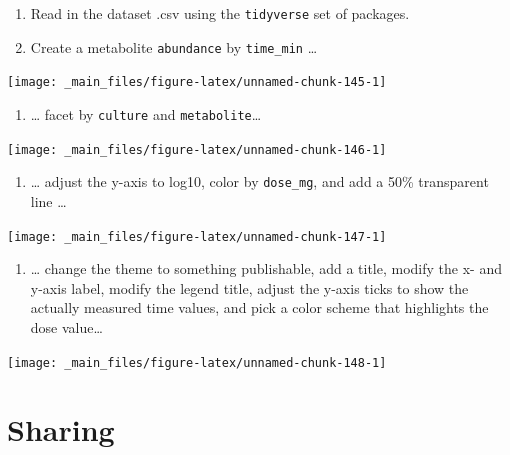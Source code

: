 \documentclass[
]{book}
\providecommand{\tightlist}{%
  \setlength{\itemsep}{0pt}\setlength{\parskip}{0pt}}
\begin{document}
\begin{enumerate}
\def\labelenumi{\arabic{enumi}.}
\setcounter{enumi}{1}
\item
  Read in the dataset .csv using the \texttt{tidyverse} set of packages.
\item
  Create a metabolite \texttt{abundance} by \texttt{time\_min} \ldots{}
\end{enumerate}

\begin{center}\texttt{[image: \_main\_files/figure-latex/unnamed-chunk-145-1]} \end{center}

\begin{enumerate}
\def\labelenumi{\arabic{enumi}.}
\setcounter{enumi}{3}
\tightlist
\item
  \ldots{} facet by \texttt{culture} and \texttt{metabolite}\ldots{}
\end{enumerate}

\begin{center}\texttt{[image: \_main\_files/figure-latex/unnamed-chunk-146-1]} \end{center}

\begin{enumerate}
\def\labelenumi{\arabic{enumi}.}
\setcounter{enumi}{3}
\tightlist
\item
  \ldots{} adjust the y-axis to log10, color by \texttt{dose\_mg}, and add a 50\% transparent line \ldots{}
\end{enumerate}

\begin{center}\texttt{[image: \_main\_files/figure-latex/unnamed-chunk-147-1]} \end{center}

\begin{enumerate}
\def\labelenumi{\arabic{enumi}.}
\setcounter{enumi}{4}
\tightlist
\item
  \ldots{} change the theme to something publishable, add a title, modify the x- and y-axis label, modify the legend title, adjust the y-axis ticks to show the actually measured time values, and pick a color scheme that highlights the dose value\ldots{}
\end{enumerate}

\begin{center}\texttt{[image: \_main\_files/figure-latex/unnamed-chunk-148-1]} \end{center}

\hypertarget{sharing}{%
\chapter{Sharing}\label{sharing}}
\end{document}
